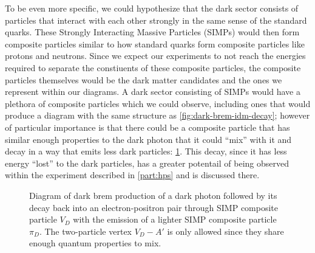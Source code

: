 To be even more specific, we could hypothesize that the dark sector consists of particles that
interact with each other strongly in the same sense of the standard quarks. These Strongly
Interacting Massive Particles (SIMPs) \cite{simp-mechanism-2014,simp-pheno-2018} would then form composite particles similar to how standard
quarks form composite particles like protons and neutrons. Since we expect our experiments to
not reach the energies required to separate the constiuents of these composite particles,
the composite particles themselves would be the dark matter candidates and the ones we represent
within our diagrams. A dark sector consisting of SIMPs would have a plethora of composite particles
which we could observe, including ones that would produce a diagram with the same structure as
\cref{fig:dark-brem-idm-decay}; however of particular importance is that there could be a composite
particle that has similar enough properties to the dark photon that it could ``mix'' with it and 
decay in a way that emits less dark particles: \cref{fig:dark-brem-simp-decay}. This decay, since
it has less energy ``lost'' to the dark particles, has a greater potentail of being observed within
the experiment described in \cref{part:hps} and is discussed there.

\begin{figure}
  \centering
  \caption{
    Diagram of dark brem production of a dark photon followed by its decay back into an electron-positron pair
    through SIMP composite particle $V_D$ with the emission of a lighter SIMP composite particle $\pi_D$.
    The two-particle vertex $V_D-A'$ is only allowed since they share enough quantum properties to mix.
  }
  \label{fig:dark-brem-simp-decay}
\end{figure}


